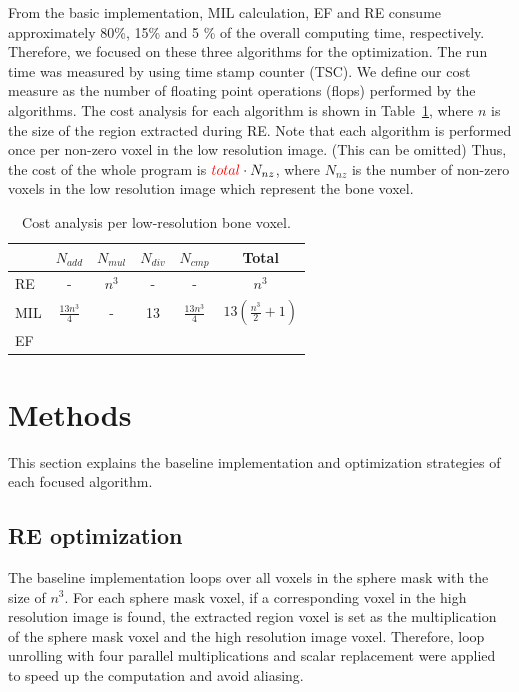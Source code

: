 \documentclass[letterpaper]{article}
\begin{document}
From the basic implementation, MIL calculation, EF and RE consume approximately {\color{red} 80\%, 15\% and 5 \%} of the overall computing time, respectively. Therefore, we focused on these three algorithms for the optimization. The run time was measured by using time stamp counter (TSC).  We define our cost measure as the number of floating point operations (flops) performed by the algorithms. The cost analysis for each algorithm is shown in Table~\ref{tab:cost}, where $n$ is the size of the region extracted during RE. Note that each algorithm is performed once per non-zero voxel in the low resolution image. {\color{red} (This can be omitted)} Thus, the cost of the whole program is ${\color{red} total}\cdot N_{nz}$, where $N_{nz}$ is the number of non-zero voxels in the low resolution image which represent the bone voxel.

\begin{table}[H]
    \caption{Cost analysis per low-resolution bone voxel.}
    \label{tab:cost}
    \begin{tabular}{l c c c c | c}
        \toprule
        & $N_{add}$ & $N_{mul}$ & $N_{div}$ & $N_{cmp}$ & Total\\
        \midrule
        RE & - & $n^{3}$ & - & - &   $n^{3}$\\
        MIL & $\frac{13n^{3}}{4}$ & -  & 13 & $\frac{13n^{3}}{4}$ &  $13(\frac{n^{3}}{2}+1)$\\
        EF & & & & & \\
        \bottomrule
    \end{tabular}
\end{table}


\section{Methods}\label{sec:yourmethod}
This section explains the baseline implementation and optimization strategies of each focused algorithm.

\subsection{RE optimization} The baseline implementation loops over all voxels in the sphere mask with the size of $n^{3}$. For each sphere mask voxel, if a corresponding voxel in the high resolution image is found, the extracted region voxel is set as the multiplication of the sphere mask voxel and the high resolution image voxel. Therefore, loop unrolling with four parallel multiplications and scalar replacement were applied to speed up the computation and avoid aliasing. 
\end{document}
